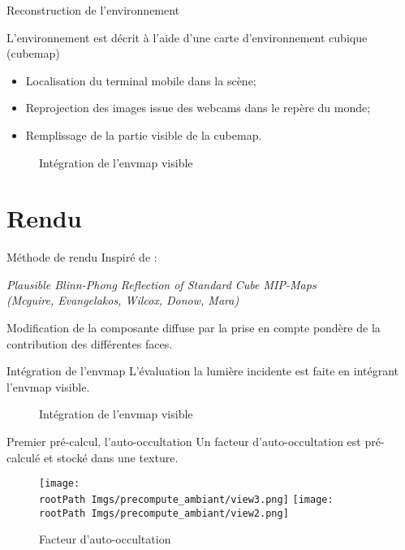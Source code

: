\documentclass{beamer}
\newcommand*{\rootPath}{}
\begin{document}
\begin{frame}{Reconstruction de l'environnement}

	L'environnement est décrit à l'aide d'une carte d'environnement cubique (cubemap)
	
	\begin{minipage}{.45\textwidth}
		\begin{itemize}
			\item Localisation du terminal mobile dans la scène;
			\item Reprojection des images issue des webcams dans le repère du monde;
			\item Remplissage de la partie visible de la cubemap.
		\end{itemize}
	\end{minipage}
	\hfill
	\begin{minipage}{.45\textwidth}
		\begin{figure}[!ht]\centering
			
			\caption{Intégration de l'envmap visible}
		\end{figure}	
	\end{minipage}
	
\end{frame}

\section{Rendu}

\begin{frame}{Méthode de rendu}
	Inspiré de :
	\begin{center}\emph{Plausible Blinn-Phong Reflection of Standard Cube MIP-Maps\\(Mcguire, Evangelakos, Wilcox, Donow, Mara)}\end{center}
	Modification de la composante diffuse par la prise en compte pondère de la contribution des différentes faces.
\end{frame}

\begin{frame}{Intégration de l'envmap}
	L'évaluation la lumière incidente est faite en intégrant l'envmap visible.
	\begin{figure}[!ht]
		\centering
		
		\caption{Intégration de l'envmap visible}
	\end{figure}
\end{frame}	

\begin{frame}{Premier pré-calcul, l'auto-occultation}
	Un facteur d'auto-occultation est pré-calculé et stocké dans une texture.
	\begin{figure}[!ht]
		\centering
			\texttt{[image: \\rootPath Imgs/precompute\_ambiant/view3.png]}
			\hspace{0.5cm}
			\texttt{[image: \\rootPath Imgs/precompute\_ambiant/view2.png]}
		\caption{Facteur d'auto-occultation}
	\end{figure}	
\end{frame}
\end{document}
